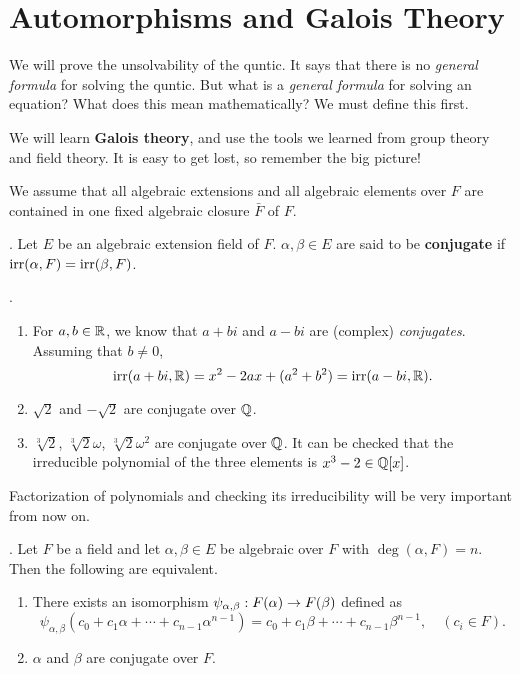 \chapter{Automorphisms and Galois Theory}

We will prove the unsolvability of the quntic. It says that there is no \textit{general formula} for solving the quntic. But what is a \textit{general formula} for solving an equation? What does this mean mathematically? We must define this first.

We will learn \textbf{Galois theory}, and use the tools we learned from group theory and field theory. It is easy to get lost, so remember the big picture!

We assume that all algebraic extensions and all algebraic elements over \(F\) are contained in one fixed algebraic closure \(\bar{F}\) of \(F\).

\setcounter{topic}{47}

.  Let \(E\) be an algebraic extension field of \(F\). \(\alpha, \beta \in E\) are said to be \textbf{conjugate} if \(\mathrm{irr}(\alpha, F) = \mathrm{irr}(\beta, F)\).

\ex.
\begin{enumerate}
    \item For \(a, b \in \mathbb{R}\), we know that \(a+bi\) and \(a-bi\) are (complex) \textit{conjugates}. Assuming that \(b \neq 0\),
          \[
              \mathrm{irr}(a + bi, \mathbb{R}) = x^2 - 2ax + (a^2 + b^2) = \mathrm{irr}(a - bi, \mathbb{R}).
          \]

    \item \(\sqrt{2}\) and \(-\sqrt{2}\) are conjugate over \(\mathbb{Q}\).
    \item \(\sqrt[3]{2}\), \(\sqrt[3]{2}\omega\), \(\sqrt[3]{2}\omega^2\) are conjugate over \(\mathbb{Q}\). It can be checked that the irreducible polynomial of the three elements is \(x^3 - 2 \in \mathbb{Q}[x]\).
\end{enumerate}

\rmk Factorization of polynomials and checking its irreducibility will be very important from now on.

\pagebreak

\thm.  Let \(F\) be a field and let \(\alpha, \beta \in E\) be algebraic over \(F\) with \(\deg(\alpha, F) = n\). Then the following are equivalent.
\begin{enumerate}
    \item There exists an isomorphism \(\psi_{\alpha, \beta} : F(\alpha) \rightarrow F(\beta)\) defined as
          \[
              \psi_{\alpha, \beta}(c_0 + c_1 \alpha + \cdots + c_{n-1} \alpha^{n-1}) = c_0 + c_1\beta + \cdots + c_{n-1} \beta^{n-1}, \quad (c_i \in F).
          \]

    \item \(\alpha\) and \(\beta\) are conjugate over \(F\).
\end{enumerate}

